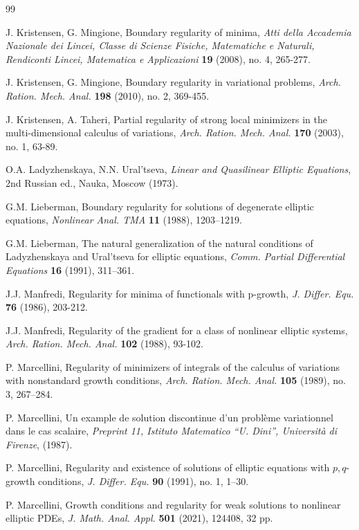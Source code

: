 \documentclass[10pt,reqno]{amsart}
\newcommand *\w{^\wedge}
\theoremstyle{definition}
\numberwithin{equation}{section}
\begin{document}
\begin{thebibliography}{99}
{
J. Kristensen, G. Mingione,
Boundary regularity of minima,
{\it Atti della Accademia Nazionale dei Lincei, Classe di Scienze Fisiche, Matematiche e Naturali, Rendiconti Lincei, Matematica e Applicazioni} \textbf{19} (2008), no. 4, 265-277.

J. Kristensen, G. Mingione,
Boundary regularity in variational problems,
{\it Arch. Ration. Mech. Anal.} \textbf{198} (2010), no. 2, 369-455.


J. Kristensen, A. Taheri,
Partial regularity of strong local minimizers in the multi-dimensional calculus of variations,
{\it Arch. Ration. Mech. Anal.} \textbf{170} (2003), no. 1, 63-89.

O.A. Ladyzhenskaya, N.N. Ural'tseva, 
{\it Linear and Quasilinear Elliptic Equations}, 
2nd Russian ed., Nauka, Moscow (1973).

G.M. Lieberman, 
Boundary regularity for solutions of degenerate elliptic equations, 
{\it Nonlinear Anal. TMA} \textbf{11} (1988), 1203–1219.

G.M. Lieberman, 
The natural generalization of the natural conditions of Ladyzhenskaya and Ural'tseva for elliptic equations, 
{\it Comm. Partial Differential Equations} \textbf{16} (1991), 311–361.

J.J. Manfredi,
Regularity for minima of functionals with p-growth,
{\it  J. Differ. Equ.} \textbf{76} (1986), 203-212.

J.J. Manfredi,
Regularity of the gradient for a class of nonlinear elliptic systems,
{\it Arch. Ration. Mech. Anal.} \textbf{102} (1988), 93-102.

P. Marcellini, 
Regularity of minimizers of integrals of the calculus of variations with nonstandard growth conditions, 
{\it Arch. Ration. Mech. Anal.} \textbf{105} (1989), no. 3, 267–284.

  P. Marcellini, Un example de solution discontinue d’un problème variationnel dans le cas scalaire, \textit{Preprint 11, 
Istituto Matematico “U. Dini”, Università di Firenze}, (1987).

P. Marcellini, 
Regularity and existence of solutions of elliptic equations with $p,q$-growth conditions, 
{\it J. Differ. Equ.} \textbf{90} (1991), no. 1, 1–30.


P. Marcellini, 
Growth conditions and regularity for weak solutions to nonlinear elliptic PDEs, 
{\it J. Math. Anal. Appl.} \textbf{501} (2021), 124408, 32 pp.

}
\end{thebibliography}
\end{document}
